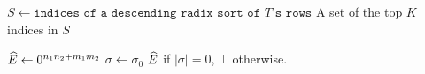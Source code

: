 \begin{algorithm}
	\caption{$\texttt{sort-top-K(T)}$}\label{alg:sort-top-k}
	\BlankLine
	$S \gets \texttt{indices of a descending radix sort of $T$'s rows}$\;
	\BlankLine
	\Return A set of the top $K$ indices in $S$\;
\end{algorithm}

\begin{algorithm}
	\caption{$\texttt{probabilistic-set-flip($E$)}$}\label{alg:pfm}
	$\widehat{E} \gets 0^{n_1n_2 + m_1m_2}$\;
	$\sigma \gets \sigma_0$\;
		\Return $\widehat{E}$ if $|\sigma| = 0$, $\bot$ otherwise.
\end{algorithm}